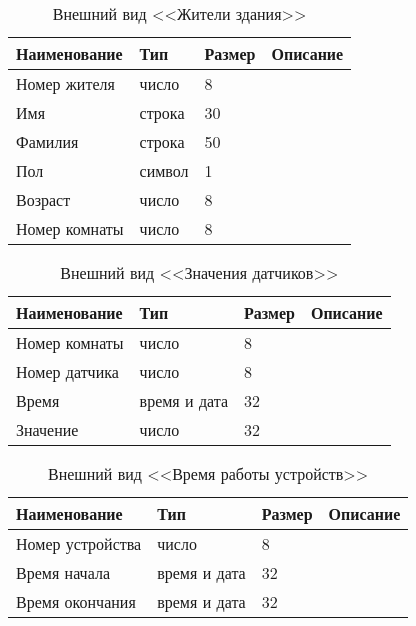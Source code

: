           \begin{table}[h!]
            \centering
            \caption{Внешний вид <<Жители здания>>}
            \label{sensor:size}
            \begin{tabular}{|l|l|l|l|}
            \hline
            Наименование & Тип & Размер & Описание \\ \hline
            Номер жителя & число & 8 & \\ \hline
            Имя & строка & 30 & \\ \hline
            Фамилия & строка & 50 & \\ \hline
            Пол & символ & 1 & \\ \hline
            Возраст & число & 8 & \\ \hline
            Номер комнаты & число & 8 & \\ \hline
            \end{tabular}
          \end{table}
          \begin{table}[h!]
            \centering
            \caption{Внешний вид <<Значения датчиков>>}
            \label{room:size}
            \begin{tabular}{|l|l|l|l|}
            \hline
            Наименование & Тип & Размер & Описание \\ \hline
            Номер комнаты & число & 8 & \\ \hline
            Номер датчика & число & 8 & \\ \hline
            Время & время и дата & 32 & \\ \hline
            Значение & число & 32 & \\ \hline
            \end{tabular}
          \end{table}
          \begin{table}[h!]
            \centering
            \caption{Внешний вид <<Время работы устройств>>}
            \label{room:size}
            \begin{tabular}{|l|l|l|l|}
            \hline
            Наименование & Тип & Размер & Описание \\ \hline
            Номер устройства & число & 8 & \\ \hline
            Время начала & время и дата & 32 &          \\ \hline
            Время окончания & время и дата & 32 &          \\ \hline
            \end{tabular}
          \end{table}

